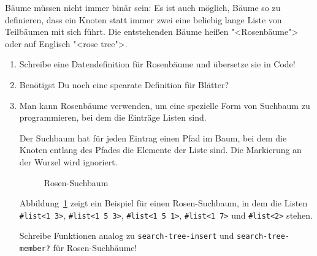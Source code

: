 \begin{aufgabe}
  Bäume müssen nicht immer binär sein: Es ist auch möglich, Bäume so
  zu definieren, dass ein Knoten statt immer zwei eine beliebig lange
  Liste von Teilbäumen mit sich führt.  Die entstehenden Bäume heißen
  "<Rosenbäume"> oder auf Englisch "<rose tree">.

  \begin{enumerate}
  \item Schreibe eine Datendefinition für Rosenbäume und übersetze sie
    in Code!
  \item Benötigst Du noch eine spearate Definition für Blätter?
  \item Man kann Rosenbäume verwenden, um eine spezielle Form von
    Suchbaum zu programmieren, bei dem die Einträge Listen sind.

    Der Suchbaum hat für jeden Eintrag einen Pfad im Baum, bei dem die
    Knoten entlang des Pfades die Elemente der Liste sind.  Die
    Markierung an der Wurzel wird ignoriert.

    \begin{figure}[tb]
      \centering
{}
      
      \caption{Rosen-Suchbaum}
      \label{fig:rose-search-tree}
    \end{figure}

    Abbildung~\ref{fig:rose-search-tree} zeigt ein Beispiel für einen
    Rosen-Suchbaum, in dem die Listen \lstinline{#list<1 3>},
    \lstinline{#list<1 5 3>}, \lstinline{#list<1 5 1>},
    \lstinline{#list<1 7>} und \lstinline{#list<2>} stehen.

    Schreibe Funktionen analog zu \lstinline{search-tree-insert} und
    \lstinline{search-tree-member?} für Rosen-Suchbäume!
  \end{enumerate}
\end{aufgabe}

